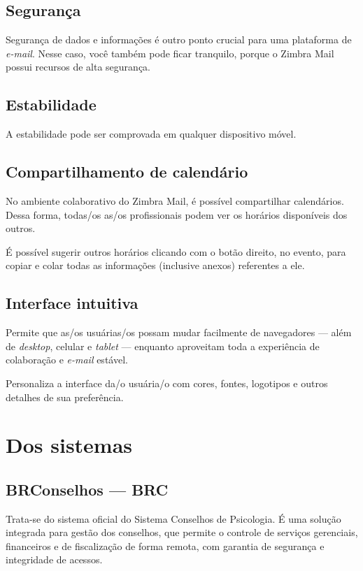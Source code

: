 \documentclass[openright, twoside, a4paper]{memoir}
\begin{document}
\section{Segurança}

Segurança de dados e informações é outro ponto crucial para uma
plataforma de \emph{e-mail}. Nesse caso, você também pode ficar
tranquilo, porque o Zimbra Mail possui recursos de alta segurança.

\section{Estabilidade}

A estabilidade pode ser comprovada em qualquer dispositivo móvel.

\section{Compartilhamento de
calendário}

No ambiente colaborativo do Zimbra Mail, é possível compartilhar
calendários. Dessa forma, todas/os as/os profissionais podem ver os
horários disponíveis dos outros.

É possível sugerir outros horários clicando com o botão direito, no
evento, para copiar e colar todas as informações (inclusive anexos)
referentes a ele.

\section{Interface intuitiva}

Permite que as/os usuárias/os possam mudar facilmente de navegadores ---
além de \emph{desktop}, celular e \emph{tablet} --- enquanto aproveitam
toda a experiência de colaboração e \emph{e-mail} estável.

Personaliza a interface da/o usuária/o com cores, fontes, logotipos e
outros detalhes de sua preferência.

\clearpage\chapter{Dos sistemas}

\section{BRConselhos --- BRC}

Trata-se do sistema oficial do Sistema Conselhos de Psicologia. É uma
solução integrada para gestão dos conselhos, que permite o controle de
serviços gerenciais, financeiros e de fiscalização de forma remota, com
garantia de segurança e integridade de acessos.
\end{document}
